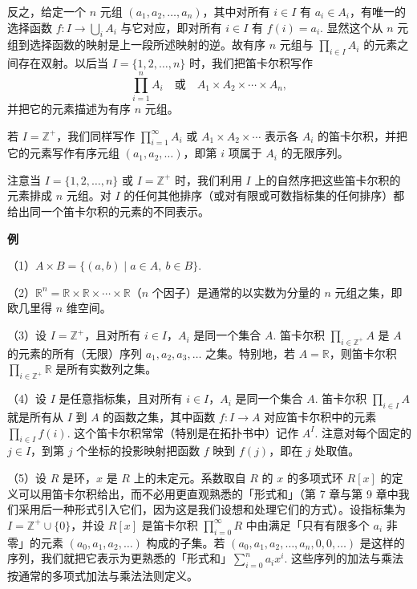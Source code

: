 反之，给定一个 \(n\) 元组 \((a_1, a_2, \ldots, a_n)\)，其中对所有 \(i \in I\) 有 \(a_i \in A_i\)，有唯一的选择函数 \(f : I \to \bigcup_i A_i\) 与它对应，即对所有 \(i \in I\) 有 \(f(i) = a_i\). 显然这个从 \(n\) 元组到选择函数的映射是上一段所述映射的逆。故有序 \(n\) 元组与 \(\prod_{i \in I}A_i\) 的元素之间存在双射。以后当 \(I = \{1, 2, \ldots, n\}\) 时，我们把笛卡尔积写作
\[
\prod_{i=1}^{n}A_i \quad \text{或} \quad A_1 \times A_2 \times \cdots \times A_n,
\]
并把它的元素描述为有序 \(n\) 元组。

若 \(I = \mathbb{Z}^+\)，我们同样写作 \(\prod_{i=1}^{\infty}A_i\) 或 \(A_1 \times A_2 \times \cdots\) 表示各 \(A_i\) 的笛卡尔积，并把它的元素写作有序元组 \((a_1, a_2, \ldots)\)，即第 \(i\) 项属于 \(A_i\) 的无限序列。

注意当 \(I = \{1, 2, \ldots, n\}\) 或 \(I = \mathbb{Z}^+\) 时，我们利用 \(I\) 上的自然序把这些笛卡尔积的元素排成 \(n\) 元组。对 \(I\) 的任何其他排序（或对有限或可数指标集的任何排序）都给出同一个笛卡尔积的元素的不同表示。

\noindent\textbf{例}

（1）\(A \times B = \{(a, b) \mid a \in A,\ b \in B\}\).

（2）\(\mathbb{R}^n = \mathbb{R} \times \mathbb{R} \times \cdots \times \mathbb{R}\)（\(n\) 个因子）是通常的以实数为分量的 \(n\) 元组之集，即欧几里得 \(n\) 维空间。

（3）设 \(I = \mathbb{Z}^+\)，且对所有 \(i \in I\)，\(A_i\) 是同一个集合 \(A\). 笛卡尔积 \(\prod_{i \in \mathbb{Z}^+}A\) 是 \(A\) 的元素的所有（无限）序列 \(a_1, a_2, a_3, \ldots\) 之集。特别地，若 \(A = \mathbb{R}\)，则笛卡尔积 \(\prod_{i \in \mathbb{Z}^+}\mathbb{R}\) 是所有实数列之集。

（4）设 \(I\) 是任意指标集，且对所有 \(i \in I\)，\(A_i\) 是同一个集合 \(A\). 笛卡尔积 \(\prod_{i \in I}A\) 就是所有从 \(I\) 到 \(A\) 的函数之集，其中函数 \(f : I \to A\) 对应笛卡尔积中的元素 \(\prod_{i \in I}f(i)\). 这个笛卡尔积常常（特别是在拓扑书中）记作 \(A^I\). 注意对每个固定的 \(j \in I\)，到第 \(j\) 个坐标的投影映射把函数 \(f\) 映到 \(f(j)\)，即在 \(j\) 处取值。

（5）设 \(R\) 是环，\(x\) 是 \(R\) 上的未定元。系数取自 \(R\) 的 \(x\) 的多项式环 \(R[x]\) 的定义可以用笛卡尔积给出，而不必用更直观熟悉的「形式和」（第 7 章与第 9 章中我们采用后一种形式引入它们，因为这是我们设想和处理它们的方式）。设指标集为 \(I = \mathbb{Z}^+ \cup \{0\}\)，并设 \(R[x]\) 是笛卡尔积 \(\prod_{i=0}^{\infty}R\) 中由满足「只有有限多个 \(a_i\) 非零」的元素 \((a_0, a_1, a_2, \ldots)\) 构成的子集。若 \((a_0, a_1, a_2, \ldots, a_n, 0, 0, \ldots)\) 是这样的序列，我们就把它表示为更熟悉的「形式和」\(\sum_{i=0}^{n}a_ix^i\). 这些序列的加法与乘法按通常的多项式加法与乘法法则定义。

